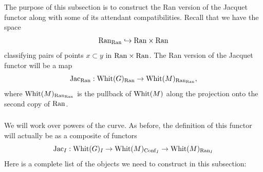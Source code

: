 \subsubsection{} The purpose of this subsection is to construct the Ran version of the Jacquet functor along with some of its attendant compatibilities. Recall that we have the space
    \[\mathrm{Ran}_{\mathrm{Ran}} \hookrightarrow \mathrm{Ran} \times \mathrm{Ran}\]
classifying pairs of points $x \subset y$ in $\mathrm{Ran} \times \mathrm{Ran}$. The Ran version of the Jacquet functor will be a map        \[\mathrm{Jac}_{\mathrm{Ran}} : \mathrm{Whit}(G)_{\mathrm{Ran}} \to \mathrm{Whit}(M)_{\mathrm{Ran}_{\mathrm{Ran}}},\]
where $\mathrm{Whit}(M)_{\mathrm{Ran}_{\mathrm{Ran}}}$ is the pullback of $\mathrm{Whit}(M)$ along the projection onto the second copy of $\mathrm{Ran}$. 

\subsubsection{} We will work over powers of the curve. As before, the definition of this functor will actually be as a composite of functors
    \[\mathrm{Jac}_I : \mathrm{Whit}(G)_I \to \mathrm{Whit}(M)_{\mathrm{Conf}_I} \to \mathrm{Whit}(M)_{\mathrm{Ran}_I}\]
Here is a complete list of the objects we need to construct in this subsection:
